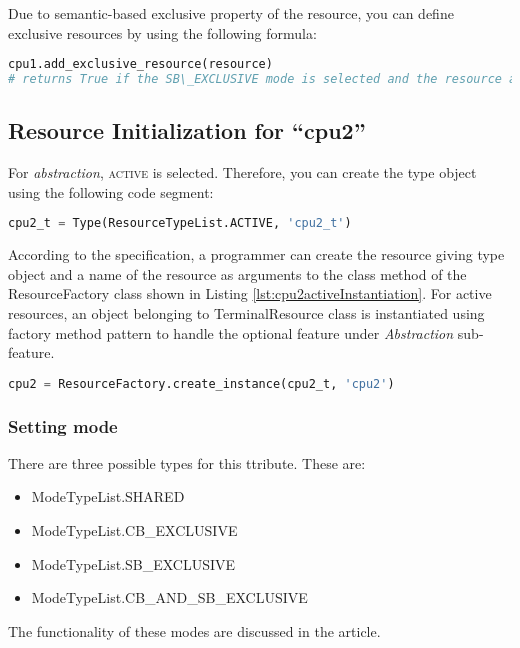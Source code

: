\documentclass[]{scrartcl}
\begin{document}
Due to semantic-based exclusive property of the resource, you can define exclusive resources by using the following formula:

\begin{lstlisting}[language=Python, frame=single, label={lst:cpu1addSBExclusiveResource}, caption={A function for adding exclusive resources.}]
cpu1.add_exclusive_resource(resource)
# returns True if the SB\_EXCLUSIVE mode is selected and the resource argument is not in the list of exclusive resources. Otherwise, it returns False.
\end{lstlisting}
        
        
\subsection{Resource Initialization for ``\textsf{cpu2}''}
        
For \emph{abstraction}, \textsc{active} is selected. Therefore, you can create the type object using the following code segment:

\begin{lstlisting}[language=Python, frame=single, label={lst:activeType}, caption={Active resource type object instantiation}]
cpu2_t = Type(ResourceTypeList.ACTIVE, 'cpu2_t')
\end{lstlisting}
        
        
According to the specification, a programmer can create the resource giving type object and a name of the resource as arguments to the class method of the
ResourceFactory class shown in Listing \ref{lst:cpu2activeInstantiation}. For active resources, an object belonging to \textsf{TerminalResource} class is instantiated
using factory method pattern to handle the optional feature under \emph{Abstraction} sub-feature.


\begin{lstlisting}[language=Python, frame=single, label={lst:cpu2activeInstantiation}, caption={Active resource instantiation using ResourceFactory class}]
cpu2 = ResourceFactory.create_instance(cpu2_t, 'cpu2')
\end{lstlisting}
        

\subsubsection{Setting mode}
There are three possible types for this ttribute. These are:
\begin{itemize}
    \item \textsf{ModeTypeList.SHARED}
    \item \textsf{ModeTypeList.CB\_EXCLUSIVE}
    \item \textsf{ModeTypeList.SB\_EXCLUSIVE}
    \item \textsf{ModeTypeList.CB\_AND\_SB\_EXCLUSIVE}
\end{itemize}
The functionality of these modes are discussed in the article.
\end{document}
